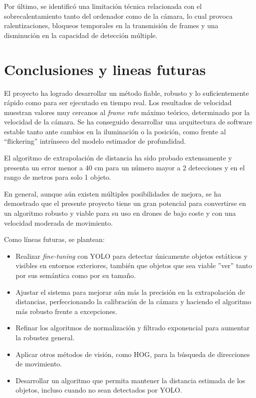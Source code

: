 Por último, se identificó una limitación técnica relacionada con el sobrecalentamiento tanto del ordenador como de la cámara, lo cual provoca ralentizaciones, bloqueos temporales en la transmisión de frames y una disminución en la capacidad de detección múltiple.

  \chapter{Conclusiones y lineas futuras}

El proyecto ha logrado desarrollar un método fiable, robusto y lo suficientemente rápido como para ser ejecutado en tiempo real. Los resultados de velocidad muestran valores muy cercanos al \textit{frame rate} máximo teórico, determinado por la velocidad de la cámara. Se ha conseguido desarrollar una arquitectura de software estable tanto ante cambios en la iluminación o la posición, como frente al ``flickering'' intrínseco del modelo estimador de profundidad.

El algoritmo de extrapolación de distancia ha sido probado extensamente y presenta un error menor a 40 cm para un número  mayor a 2 detecciones y en el rango de metros para solo 1 objeto.

En general, aunque aún existen múltiples posibilidades de mejora, se ha demostrado que el presente proyecto tiene un gran potencial para convertirse en un algoritmo robusto y viable para su uso en drones de bajo coste y con una velocidad moderada de movimiento.

Como líneas futuras, se plantean:

\begin{itemize}
\item Realizar \textit{fine-tuning} con YOLO para detectar únicamente objetos estáticos y visibles en entornos exteriores, también que objetos que sea viable ''ver'' tanto por sus semántica como por su tamaño.
\item Ajustar el sistema para mejorar aún más la precisión en la extrapolación de distancias, perfeccionando la calibración de la cámara y haciendo el algoritmo más robusto frente a excepciones.
\item Refinar los algoritmos de normalización y filtrado exponencial para aumentar la robustez general.
\item Aplicar otros métodos de visión, como HOG, para la búsqueda de direcciones de movimiento.
\item Desarrollar un algoritmo que permita mantener la distancia estimada de los objetos, incluso cuando no sean detectados por YOLO.
\end{itemize}

    